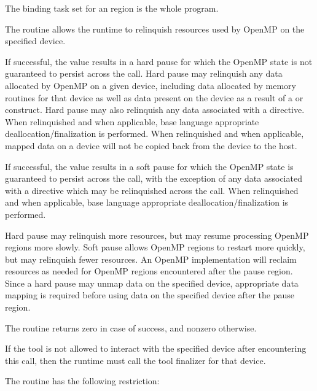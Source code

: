 \binding

The binding task set for an  region is the whole program.

\effect

The  routine allows the runtime to relinquish resources 
used by OpenMP on the specified device.

If successful, the  value results in a hard pause for which the OpenMP state is not guaranteed to 
persist across the  call. Hard pause may relinquish any 
data allocated by OpenMP on a given device, including data allocated by memory routines 
for that device as well as data present on the device as a result of a  or  construct.
Hard pause may also relinquish any data associated with a  directive.
When relinquished and when applicable, base language appropriate deallocation/finalization is performed. 
When relinquished and when applicable, mapped data on a device will not be copied back from the device to the host.

If successful, the  value results in a soft pause for which the OpenMP state 
is guaranteed to persist across the call, with the exception of any data associated with a
  directive which may be relinquished across the call. 
When relinquished and when applicable, base language appropriate deallocation/finalization is performed. 

\begin{note}
Hard pause may relinquish more resources, but may resume processing OpenMP regions more slowly. 
Soft pause allows OpenMP regions to restart more quickly, but may relinquish fewer resources. 
An OpenMP implementation will reclaim resources as needed for OpenMP regions encountered after the pause region. 
Since  a hard pause may unmap data on the specified device, appropriate data mapping is required before 
using data on the specified device after the pause region.
 \end{note}
 
The routine returns zero in case of success, and nonzero otherwise.

\tools

If the tool is not allowed to interact with the specified device after encountering this call, then the runtime must call
the tool finalizer for that device.

\restrictions
The  routine has the following restriction:


